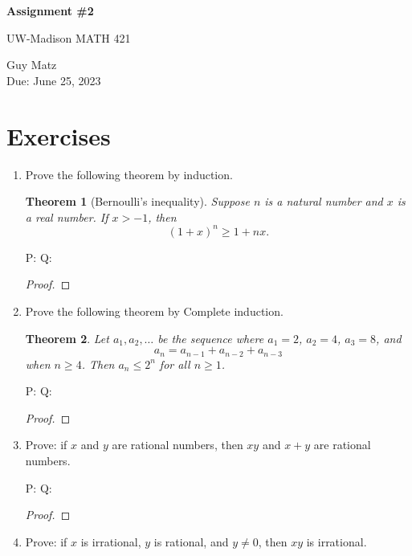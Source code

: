 \documentclass{article} %
\theoremstyle{plain}
\newtheorem*{theorem*}{Theorem}
\theoremstyle{definition}
\theoremstyle{case}
\begin{document}
\begin{center}
\Large{\textbf{Assignment \#2}
            
UW-Madison MATH 421} %
\vspace{5pt}
        
\normalsize{  Guy Matz%
        \\ Due: June 25, 2023}
\vspace{15pt}
\end{center}

\section*{Exercises}%
\begin{enumerate}[label={\fbox{\textbf{Exercise \#\arabic* :}}}]
\item Prove the following theorem by induction.  

\begin{theorem*}[Bernoulli's inequality] Suppose $n$ is a natural number and $x$ is a real number. If $x > -1$, then 
$$
(1+x)^n \geq 1 + nx.
$$
\end{theorem*} 

P: 
Q:

\begin{proof}
\end{proof} 

\newpage
\item Prove the following theorem by Complete induction.  

 \begin{theorem*} Let $a_1,a_2,\dots$ be the sequence where $a_1=2$, $a_2=4$, $a_3=8$, and 
 $$a_n = a_{n-1}+a_{n-2}+a_{n-3}$$ 
 when $n \geq 4$. Then $a_n \leq 2^n$ for all $n \geq 1$. 
 
 \end{theorem*}

P: 
Q:

\begin{proof}
\end{proof} 

\newpage
\item Prove: if $x$ and $y$ are rational numbers, then $xy$ and $x+y$ are rational numbers. 


P: 
Q:

\begin{proof}
\end{proof} 

\newpage
\item Prove: if $x$ is irrational, $y$ is rational, and $y \neq 0$, then $xy$ is irrational. 



\end{enumerate}
\end{document}
